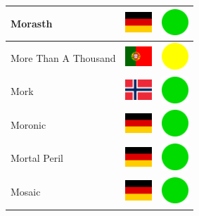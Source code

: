 \documentclass[12pt, a4paper, twoside]{report}
\begin{document}
\begin{center}
\begin{longtable}{|p{5cm}|p{2cm}|p{2cm}|}
Morasth & \includegraphics[width=1cm]{4x3/de} & \includegraphics[width=1cm]{likes/y} \\ \hline
More Than A Thousand & \includegraphics[width=1cm]{4x3/pt} & \includegraphics[width=1cm]{likes/m} \\ \hline
Mork & \includegraphics[width=1cm]{4x3/no} & \includegraphics[width=1cm]{likes/y} \\ \hline
Moronic & \includegraphics[width=1cm]{4x3/de} & \includegraphics[width=1cm]{likes/y} \\ \hline
Mortal Peril & \includegraphics[width=1cm]{4x3/de} & \includegraphics[width=1cm]{likes/y} \\ \hline
Mosaic & \includegraphics[width=1cm]{4x3/de} & \includegraphics[width=1cm]{likes/y} \\ \hline

\end{longtable}
\end{center}
\end{document}
